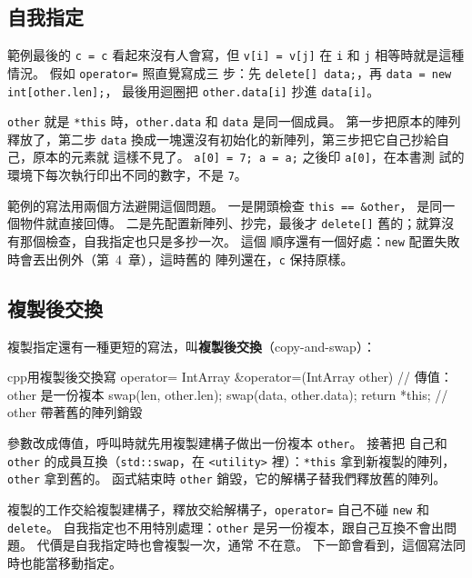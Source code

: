 \subsection{自我指定}

範例最後的 \texttt{c = c} 看起來沒有人會寫，但 \texttt{v[i] = v[j]} 在 \texttt{i}
和 \texttt{j} 相等時就是這種情況。 假如 \texttt{operator=} 照直覺寫成三
步：先 \texttt{delete[] data;}，再 \texttt{data = new int[other.len];}，
最後用迴圈把 \texttt{other.data[i]} 抄進 \texttt{data[i]}。

\texttt{other} 就是 \texttt{*this} 時，\texttt{other.data} 和
\texttt{data} 是同一個成員。 第一步把原本的陣列釋放了，第二步
\texttt{data} 換成一塊還沒有初始化的新陣列，第三步把它自己抄給自己，原本的元素就
這樣不見了。 \texttt{a[0] = 7; a = a;} 之後印 \texttt{a[0]}，在本書測
試的環境下每次執行印出不同的數字，不是 \texttt{7}。

範例的寫法用兩個方法避開這個問題。 一是開頭檢查 \texttt{this == \&other}，
是同一個物件就直接回傳。 二是先配置新陣列、抄完，最後才
\texttt{delete[]} 舊的；就算沒有那個檢查，自我指定也只是多抄一次。 這個
順序還有一個好處：\texttt{new} 配置失敗時會丟出例外（第~4~章），這時舊的
陣列還在，\texttt{c} 保持原樣。

\subsection{複製後交換}

複製指定還有一種更短的寫法，叫\textbf{複製後交換}（copy-and-swap）：

\begin{code}{cpp}{用複製後交換寫 operator=}
IntArray &operator=(IntArray other) {   // 傳值：other 是一份複本
    swap(len, other.len);
    swap(data, other.data);
    return *this;
}                                       // other 帶著舊的陣列銷毀
\end{code}

參數改成傳值，呼叫時就先用複製建構子做出一份複本 \texttt{other}。 接著把
自己和 \texttt{other} 的成員互換（\texttt{std::swap}，在
\texttt{<utility>} 裡）：\texttt{*this} 拿到新複製的陣列，\texttt{other}
拿到舊的。 函式結束時 \texttt{other} 銷毀，它的解構子替我們釋放舊的陣列。

複製的工作交給複製建構子，釋放交給解構子，\texttt{operator=} 自己不碰
\texttt{new} 和 \texttt{delete}。 自我指定也不用特別處理：\texttt{other}
是另一份複本，跟自己互換不會出問題。 代價是自我指定時也會複製一次，通常
不在意。 下一節會看到，這個寫法同時也能當移動指定。


